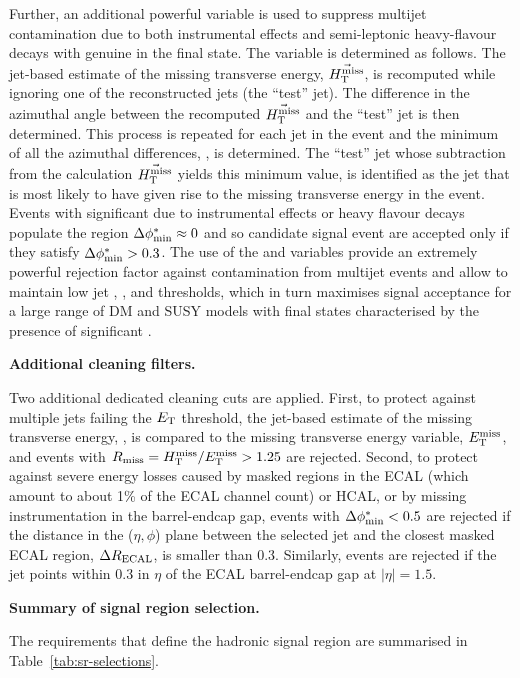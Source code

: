 Further, an additional powerful variable \bdphi is used to suppress
multijet contamination due to both instrumental effects and
semi-leptonic heavy-flavour decays with genuine \met in the final
state. The variable is determined as follows. The jet-based estimate
of the missing transverse energy, $\vec{\mbox{$H_{\rm T}^{\rm miss}$}}$, is recomputed while
ignoring one of the reconstructed jets (the ``test'' jet). The
difference in the azimuthal angle between the recomputed $\vec{\mbox{$H_{\rm T}^{\rm miss}$}}$
and the ``test'' jet is then determined. This process is repeated for
each jet in the event and the minimum of all the azimuthal
differences, \bdphi, is determined. The ``test'' jet whose subtraction
from the calculation $\vec{\mbox{$H_{\rm T}^{\rm miss}$}}$ yields this minimum value, is
identified as the jet that is most likely to have given rise to the
missing transverse energy in the event. Events with significant \mht
due to instrumental effects or heavy flavour decays populate the
region $\mbox{$\Delta\phi^{*}_{\rm min}$} \approx 0$ and so candidate signal event are accepted
only if they satisfy $\mbox{$\Delta\phi^{*}_{\rm min}$} > 0.3$. The use of the \bdphi and \alphat
variables provide an extremely powerful rejection factor against
contamination from multijet events and allow to maintain low jet \PT,
\HT, and \mht thresholds, which in turn maximises signal acceptance
for a large range of DM and SUSY models with final states
characterised by the presence of significant \met.

{\bf Additional cleaning filters.} 

Two additional dedicated cleaning cuts are applied. First, to protect
against multiple jets failing the ${E_{\text T}}$ threshold, the jet-based
estimate of the missing transverse energy, \mht, is compared to the
missing transverse energy variable, $\mbox{$E_\text{T}^{\rm miss}$}$, and events with $R_{\rm
  miss}=\mbox{$H_{\rm T}^{\rm miss}$}/\mbox{$E_\text{T}^{\rm miss}$} > 1.25$ are rejected. Second, to protect against
severe energy losses caused by masked regions in the ECAL (which
amount to about 1\% of the ECAL channel count) or HCAL, or by missing
instrumentation in the barrel-endcap gap, events with $\mbox{$\Delta\phi^{*}_{\rm min}$} < 0.5$
are rejected if the distance in the ($\eta,\phi$) plane between the
selected jet and the closest masked ECAL region, $\Delta R_{\rm
  ECAL}$, is smaller than 0.3. Similarly, events are rejected if the
jet points within 0.3 in $\eta$ of the ECAL barrel-endcap gap at
$|\eta| = 1.5$.

{\bf Summary of signal region selection.} 

The requirements that define the hadronic signal region are summarised
in Table~\ref{tab:sr-selections}.

